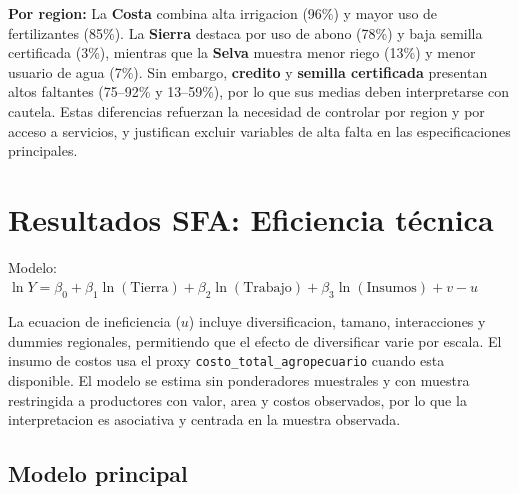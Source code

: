 \documentclass[10pt,a4paper]{article}
\begin{document}
\textbf{Por region:} La \textbf{Costa} combina alta irrigacion (96\%) y mayor uso de fertilizantes (85\%). La \textbf{Sierra} destaca por uso de abono (78\%) y baja semilla certificada (3\%), mientras que la \textbf{Selva} muestra menor riego (13\%) y menor usuario de agua (7\%). Sin embargo, \textbf{credito} y \textbf{semilla certificada} presentan altos faltantes (75--92\% y 13--59\%), por lo que sus medias deben interpretarse con cautela. Estas diferencias refuerzan la necesidad de controlar por region y por acceso a servicios, y justifican excluir variables de alta falta en las especificaciones principales.

\section{Resultados SFA: Eficiencia técnica}

Modelo: $\ln Y = \beta_0 + \beta_1 \ln(\text{Tierra}) + \beta_2 \ln(\text{Trabajo}) + \beta_3 \ln(\text{Insumos}) + v - u$

La ecuacion de ineficiencia ($u$) incluye diversificacion, tamano, interacciones y dummies regionales, permitiendo que el efecto de diversificar varie por escala. El insumo de costos usa el proxy \texttt{costo\_total\_agropecuario} cuando esta disponible. El modelo se estima sin ponderadores muestrales y con muestra restringida a productores con valor, area y costos observados, por lo que la interpretacion es asociativa y centrada en la muestra observada.

\subsection{Modelo principal}
\end{document}
